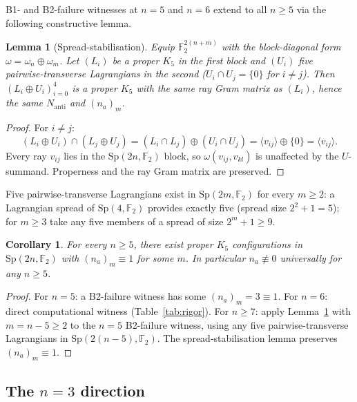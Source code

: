 \documentclass[11pt,a4paper]{article}
\newcommand{\Nanti}{N_{\mathrm{anti}}}
\newcommand{\Sp}{\mathrm{Sp}}
\newcommand{\F}{\mathbb{F}}
\theoremstyle{plain}
\newtheorem{lemma}[theorem]{Lemma}
\newtheorem{corollary}[theorem]{Corollary}
\theoremstyle{definition}
\theoremstyle{remark}
\begin{document}
B1- and B2-failure witnesses at $n = 5$ and $n = 6$ extend to all
$n \geq 5$ via the following constructive lemma.

\begin{lemma}[Spread-stabilisation]\label{lem:spread}
Equip $\F_2^{2(n+m)}$ with the block-diagonal form
$\omega = \omega_n \oplus \omega_m$.
Let $(L_i)$ be a proper $K_5$ in the first block and
$(U_i)$ five pairwise-transverse Lagrangians in the second
($U_i \cap U_j = \{0\}$ for $i \neq j$).
Then $(L_i \oplus U_i)_{i=0}^4$ is a proper $K_5$
with the same ray Gram matrix as $(L_i)$,
hence the same $\Nanti$ and $(n_a)_m$.
\end{lemma}

\begin{proof}
For $i \neq j$:
\[
  (L_i \oplus U_i) \cap (L_j \oplus U_j)
  = (L_i \cap L_j) \oplus (U_i \cap U_j)
  = \langle v_{ij} \rangle \oplus \{0\}
  = \langle v_{ij} \rangle.
\]
Every ray $v_{ij}$ lies in the $\Sp(2n,\F_2)$ block, so $\omega(v_{ij}, v_{kl})$
is unaffected by the $U$-summand.
Properness and the ray Gram matrix are preserved.
\end{proof}

Five pairwise-transverse Lagrangians exist in $\Sp(2m,\F_2)$ for every
$m \geq 2$: a Lagrangian spread of $\Sp(4,\F_2)$ provides exactly five
(spread size $2^2 + 1 = 5$); for $m \geq 3$ take any five members
of a spread of size $2^m + 1 \geq 9$.

\begin{corollary}\label{cor:nge5}
For every $n \geq 5$, there exist proper $K_5$ configurations
in $\Sp(2n,\F_2)$ with $(n_a)_m \equiv 1$ for some $m$.
In particular $n_a \not\equiv 0$ universally for any $n \geq 5$.
\end{corollary}

\begin{proof}
For $n = 5$: a B2-failure witness has some $(n_a)_m = 3 \equiv 1$.
For $n = 6$: direct computational witness (Table~\ref{tab:rigor}).
For $n \geq 7$: apply Lemma~\ref{lem:spread} with $m = n - 5 \geq 2$
to the $n = 5$ B2-failure witness, using any five pairwise-transverse
Lagrangians in $\Sp(2(n-5),\F_2)$.
The spread-stabilisation lemma preserves $(n_a)_m \equiv 1$.
\end{proof}

\subsection{\texorpdfstring{The $n = 3$ direction}{The n=3 direction}}
\end{document}

